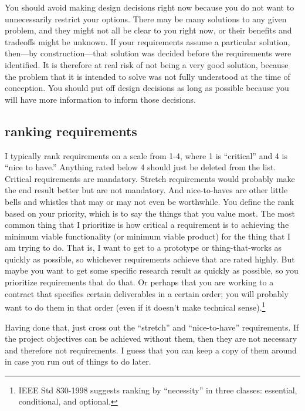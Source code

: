 \documentclass[12pt,oneside]{book}
\begin{document}
You should avoid making design decisions right now because you do not want to unnecessarily restrict your options. There may be many solutions to any given problem, and they might not all be clear to you right now, or their benefits and tradeoffs might be unknown. If your requirements assume a particular solution, then---by construction---that solution was decided before the requirements were identified. It is therefore at real risk of not being a very good solution, because the problem that it is intended to solve was not fully understood at the time of conception. You should put off design decisions as long as possible because you will have more information to inform those decisions.


\subsection*{ranking requirements}
\label{scrivauto:23}

I typically rank requirements on a scale from 1-4, where 1 is ``critical'' and 4 is ``nice to have.'' Anything rated below 4 should just be deleted from the list. Critical requirements are mandatory. Stretch requirements would probably make the end result better but are not mandatory. And nice-to-haves are other little bells and whistles that may or may not even be worthwhile. You define the rank based on your priority, which is to say the things that you value most. The most common thing that I prioritize is how critical a requirement is to achieving the minimum viable functionality (or minimum viable product) for the thing that I am trying to do. That is, I want to get to a prototype or thing-that-works as quickly as possible, so whichever requirements achieve that are rated highly. But maybe you want to get some specific research result as quickly as possible, so you prioritize requirements that do that. Or perhaps that you are working to a contract that specifies certain deliverables in a certain order; you will probably want to do them in that order (even if it doesn't make technical sense).\footnote{IEEE Std 830-1998 suggests ranking by ``necessity'' in three classes: essential, conditional, and optional.}

Having done that, just cross out the ``stretch'' and ``nice-to-have'' requirements. If the project objectives can be achieved without them, then they are not necessary and therefore not requirements. I guess that you can keep a copy of them around in case you run out of things to do later.
\end{document}
